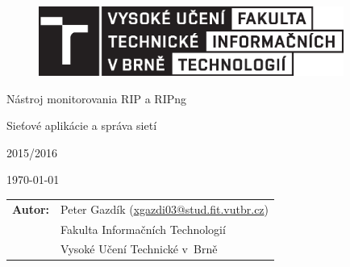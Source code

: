 \begin{titlepage}

\vspace*{2cm}
\begin{figure}[!h]
  \centering
  \includegraphics[width=10cm]{img/logo.eps}
\end{figure}

\vfill

\begin{center}

\begin{Huge}
Nástroj monitorovania RIP a RIPng
\end{Huge}

\bigskip

\begin{Large}
Sieťové aplikácie a správa sietí
\end{Large}

\bigskip

\begin{Large}
	2015/2016
\end{Large}

\end{center}

\vfill

\begin{center}
\begin{Large}
\today
\end{Large}
\end{center}

\vfill

\begin{flushleft}
\begin{normalsize}
\begin{tabular}{ll}
\bf Autor:\hspace{3mm} & Peter Gazdík (\url{xgazdi03@stud.fit.vutbr.cz}) \\[3mm]

& Fakulta Informačních Technologií \\
& Vysoké Učení Technické v~Brně
\end{tabular}
\end{normalsize}
\end{flushleft}
\end{titlepage}
